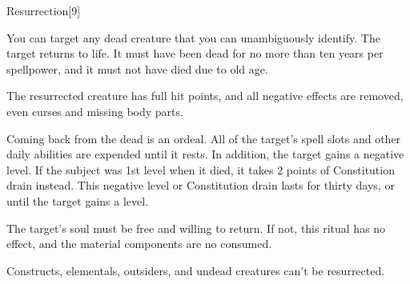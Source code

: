 \begin{spellsection}[Greater]{Resurrection}[9]
    \begin{spellheader}
    \end{spellheader}
    \begin{spellcontent}
        \begin{spelltargetinginfo}
        \end{spelltargetinginfo}
        \begin{spelleffects}

            \spellspecial You can target any dead creature that you can unambiguously identify.
            \spelleffect The target returns to life. It must have been dead for no more than ten years per spellpower, and it must not have died due to old age.

            The resurrected creature has full hit points, and all negative effects are removed, even curses and missing body parts.

            \par Coming back from the dead is an ordeal. All of the target's spell slots and other daily abilities are expended until it rests. In addition, the target gains a negative level. If the subject was 1st level when it died, it takes 2 points of Constitution drain instead. This negative level or Constitution drain lasts for thirty days, or until the target gains a level.
        \end{spelleffects}
    \end{spellcontent}
    \begin{spellfooter}
        \spellnotes The target's soul must be free and willing to return. If not, this ritual has no effect, and the material components are no consumed.

        Constructs, elementals, outsiders, and undead creatures can't be resurrected.
    \end{spellfooter}
\end{spellsection}

